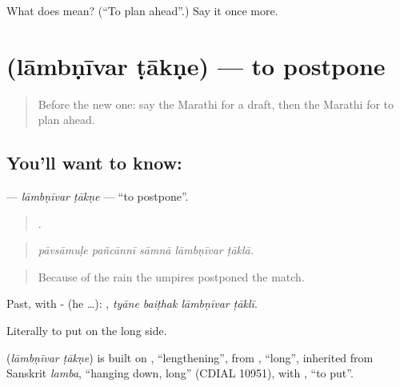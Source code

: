 \begin{tcolorbox}[breakable,colback=teal!4,colframe=teal!35!black,title={Before you move on}]
What does   mean? (\textquotedblleft{}To plan ahead\textquotedblright{}.) Say it once more.
\end{tcolorbox}
\section[\texorpdfstring{\mr{लांबणीवर} \mr{टाकणे} (lāmbṇīvar ṭākṇe)}{लांबणीवर टाकणे (lāmbṇīvar ṭākṇe)}]{  (lāmbṇīvar ṭākṇe) — to postpone}

\label{lesson:MR-C544-lambnivar-takne}



\begin{quote}
Before the new one: say the Marathi for a draft, then the Marathi for to plan ahead.
\end{quote}

\subsection*{You'll want to know:  }
\textbf{ } — \emph{lāmbṇīvar ṭākṇe} — \textquotedblleft{}to postpone\textquotedblright{}.

\begin{quote}
    .
\end{quote}

\begin{quote}
\emph{pāvsāmuḷe pañcānnī sāmnā lāmbṇīvar ṭāklā.}
\end{quote}

\begin{quote}
Because of the rain the umpires postponed the match.
\end{quote}

Past, with - (he …):    , \emph{tyāne baiṭhak lāmbṇīvar ṭāklī}.

Literally to put on the long side.

\begin{cousinweb}
\textbf{ } (\emph{lāmbṇīvar ṭākṇe}) is built on , \textquotedblleft{}lengthening\textquotedblright{}, from , \textquotedblleft{}long\textquotedblright{}, inherited from Sanskrit \emph{lamba}, \textquotedblleft{}hanging down, long\textquotedblright{} (CDIAL 10951), with , \textquotedblleft{}to put\textquotedblright{}.
\end{cousinweb}

